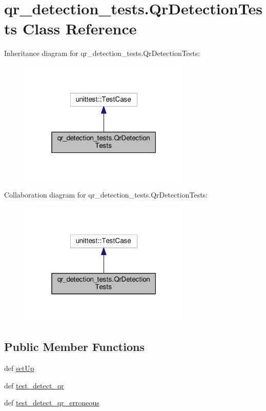 \hypertarget{classqr__detection__tests_1_1QrDetectionTests}{\section{qr\-\_\-detection\-\_\-tests.\-Qr\-Detection\-Tests Class Reference}
\label{classqr__detection__tests_1_1QrDetectionTests}
}


Inheritance diagram for qr\-\_\-detection\-\_\-tests.\-Qr\-Detection\-Tests\-:
\nopagebreak
\begin{figure}[H]
\begin{center}
\leavevmode
\includegraphics[width=232pt]{classqr__detection__tests_1_1QrDetectionTests__inherit__graph}
\end{center}
\end{figure}


Collaboration diagram for qr\-\_\-detection\-\_\-tests.\-Qr\-Detection\-Tests\-:
\nopagebreak
\begin{figure}[H]
\begin{center}
\leavevmode
\includegraphics[width=232pt]{classqr__detection__tests_1_1QrDetectionTests__coll__graph}
\end{center}
\end{figure}
\subsection*{Public Member Functions}
\begin{DoxyCompactItemize}
\item 
def \hyperlink{classqr__detection__tests_1_1QrDetectionTests_a0f60664fabfb3fd4db5e00e45b15cb7b}{set\-Up}
\item 
def \hyperlink{classqr__detection__tests_1_1QrDetectionTests_ad77dda8958b4cdf230e0bea6b9f27fb1}{test\-\_\-detect\-\_\-qr}
\item 
def \hyperlink{classqr__detection__tests_1_1QrDetectionTests_ab925de85ec1f23858e48288e4612ce1f}{test\-\_\-detect\-\_\-qr\-\_\-erroneous}
\end{DoxyCompactItemize}
